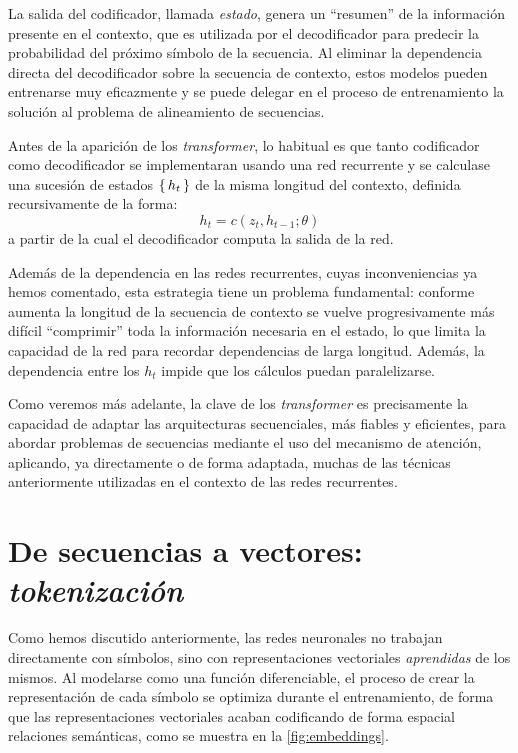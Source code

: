 La salida del codificador, llamada \textit{estado}, genera un ``resumen'' de la información presente en el contexto, que es utilizada por el decodificador para predecir la probabilidad del próximo símbolo de la secuencia. Al eliminar la dependencia directa del decodificador sobre la secuencia de contexto, estos modelos pueden entrenarse muy eficazmente y se puede delegar en el proceso de entrenamiento la solución al problema de alineamiento de secuencias.

Antes de la aparición de los \textit{transformer}, lo habitual es que tanto codificador como decodificador se implementaran usando una red recurrente y se calculase una sucesión de estados \( \{\,h_t\,\} \) de la misma longitud del contexto, definida recursivamente de la forma:
\begin{equation}\label{eq:rnn}
    h_t = c(z_t, h_{t-1}; \theta)
\end{equation}
a partir de la cual el decodificador computa la salida de la red.

Además de la dependencia en las redes recurrentes, cuyas inconveniencias ya hemos comentado, esta estrategia tiene un problema fundamental: conforme aumenta la longitud de la secuencia de contexto se vuelve progresivamente más difícil ``comprimir'' toda la información necesaria en el estado, lo que limita la capacidad de la red para recordar dependencias de larga longitud. Además, la dependencia entre los \( h_t \) impide que los cálculos puedan paralelizarse. 

Como veremos más adelante, la clave de los \textit{transformer} es precisamente la capacidad de adaptar las arquitecturas secuenciales, más fiables y eficientes, para abordar problemas de secuencias mediante el uso del mecanismo de atención, aplicando, ya directamente o de forma adaptada, muchas de las técnicas anteriormente utilizadas en el contexto de las redes recurrentes. 

\section{De secuencias a vectores: \textit{tokenización}}
Como hemos discutido anteriormente, las redes neuronales no trabajan directamente con símbolos, sino con representaciones vectoriales \textit{aprendidas} de los mismos. Al modelarse como una función diferenciable, el proceso de crear la representación de cada símbolo se optimiza durante el entrenamiento, de forma que las representaciones vectoriales acaban codificando de forma espacial relaciones semánticas, como se muestra en la \cref{fig:embeddings}.

